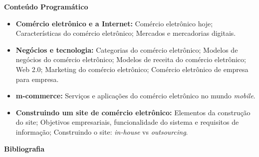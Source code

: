 
\begin{snugshade}\begin{center}\textbf{
    Conteúdo Programático
}\end{center}\end{snugshade}

\begin{itemize}

\item \textbf{Comércio eletrônico e a Internet:}
    Comércio eletrônico hoje;
    Características do comércio eletrônico;
    Mercados e mercadorias digitais.

\item \textbf{Negócios e tecnologia:}
    Categorias do comércio eletrônico;
    Modelos de negócios do comércio eletrônico;
    Modelos de receita do comércio eletrônico;
    Web 2.0;
    Marketing do comércio eletrônico;
    Comércio eletrônico de empresa para empresa.

\item \textbf{m-commerce:}
    Serviços e aplicações do comércio eletrônico no mundo \textit{mobile}.

\item \textbf{Construindo um site de comércio eletrônico:}
    Elementos da construção do site;
    Objetivos empresariais, funcionalidade do sistema e requisitos de informação;
    Construindo o site: \textit{in-house} vs \textit{outsourcing}.

\end{itemize}







\begin{snugshade}\begin{center}\textbf{
    Bibliografia
}\end{center}\end{snugshade}

